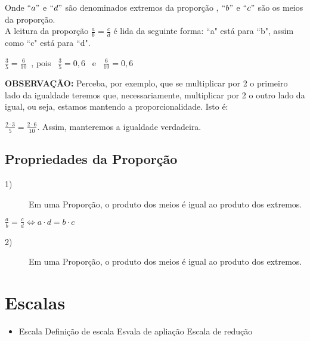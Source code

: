 \noindent Onde $``a"$ e $``d"$ são denominados extremos da proporção , $``b"$ e $``c"$ são os meios da proporção.\\
\noindent A leitura da proporção  $\frac{a}{b} = \frac{c}{d}$ é lida da seguinte forma: ``a" está para ``b", assim como ``c" está para ``d".

\begin{example}
    $\frac{3}{5}=\frac{6}{10}$~, pois~ $\frac{3}{5}=0,6$~ e ~$\frac{6}{10}=0,6$
\end{example}

\noindent \textbf{OBSERVAÇÃO:} Perceba, por exemplo, que se multiplicar por 2 o primeiro lado da igualdade teremos que, necessariamente, multiplicar por 2 o outro lado da igual, ou seja, estamos mantendo a proporcionalidade. Isto é:

\begin{example}
    $\frac{2 \cdot 3}{5}=\frac{2 \cdot 6}{10}$. Assim, manteremos a igualdade verdadeira. 
\end{example}

\subsection{Propriedades da Proporção}
    \begin{description}
    \item[1)] Em uma Proporção, o produto dos meios é igual ao produto dos extremos.
    \end{description}
 
 \begin{center}
    $\frac{a}{b} = \frac{c}{d} \Longleftrightarrow a\cdot d=b \cdot c$     
 \end{center}   

    \begin{description}
    \item[2)] Em uma Proporção, o produto dos meios é igual ao produto dos extremos. 
    \end{description}

\section{Escalas}

	\begin{itemize}
		\item Escala
		\subitem Definição de escala 
		\subitem Esvala de apliação
		\subitem Escala de redução
	\end{itemize}

